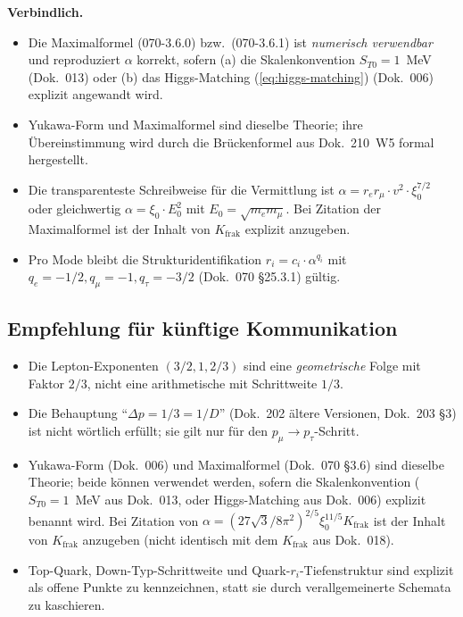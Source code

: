 \textbf{Verbindlich.}
\begin{itemize}[leftmargin=2em,itemsep=2pt,topsep=2pt]
  \item Die Maximalformel (070-3.6.0) bzw.\ (070-3.6.1) ist
        \emph{numerisch verwendbar} und reproduziert $\alpha$ korrekt,
        sofern (a) die Skalenkonvention $S_{T0} = 1$~MeV (Dok.~013)
        oder (b) das Higgs-Matching (\ref{eq:higgs-matching}) (Dok.~006)
        explizit angewandt wird.
  \item Yukawa-Form und Maximalformel sind dieselbe Theorie; ihre
        Übereinstimmung wird durch die Brückenformel aus Dok.~210~W5
        formal hergestellt.
  \item Die transparenteste Schreibweise für die Vermittlung ist
        $\alpha = r_e r_\mu \cdot v^2 \cdot \xi_0^{7/2}$ oder
        gleichwertig $\alpha = \xi_0 \cdot E_0^2$ mit
        $E_0 = \sqrt{m_e m_\mu}$. Bei Zitation der Maximalformel
        ist der Inhalt von $K_{\text{frak}}$ explizit anzugeben.
  \item Pro Mode bleibt die Strukturidentifikation
        $r_i = c_i \cdot \alpha^{q_i}$ mit
        $q_e = -1/2, q_\mu = -1, q_\tau = -3/2$
        (Dok.~070 §25.3.1) gültig.
\end{itemize}

\subsection{Empfehlung für künftige Kommunikation}

\begin{itemize}[leftmargin=2em,itemsep=2pt,topsep=2pt]
  \item Die Lepton-Exponenten $(3/2, 1, 2/3)$ sind eine
        \emph{geometrische} Folge mit Faktor $2/3$, nicht eine
        arithmetische mit Schrittweite $1/3$.
  \item Die Behauptung \enquote{$\Delta p = 1/3 = 1/D$}
        (Dok.~202 ältere Versionen, Dok.~203 §3) ist nicht
        wörtlich erfüllt; sie gilt nur für den $p_\mu \to p_\tau$-Schritt.
  \item Yukawa-Form (Dok.~006) und Maximalformel (Dok.~070 §3.6)
        sind dieselbe Theorie; beide können verwendet werden, sofern
        die Skalenkonvention ($S_{T0} = 1$~MeV aus Dok.~013, oder
        Higgs-Matching aus Dok.~006) explizit benannt wird. Bei
        Zitation von $\alpha = (27\sqrt{3}/8\pi^2)^{2/5}\xi_0^{11/5}
        K_{\text{frak}}$ ist der Inhalt von $K_{\text{frak}}$
        anzugeben (nicht identisch mit dem $K_{\text{frak}}$ aus
        Dok.~018).
  \item Top-Quark, Down-Typ-Schrittweite und Quark-$r_i$-Tiefenstruktur
        sind explizit als offene Punkte zu kennzeichnen, statt sie
        durch verallgemeinerte Schemata zu kaschieren.
\end{itemize}

